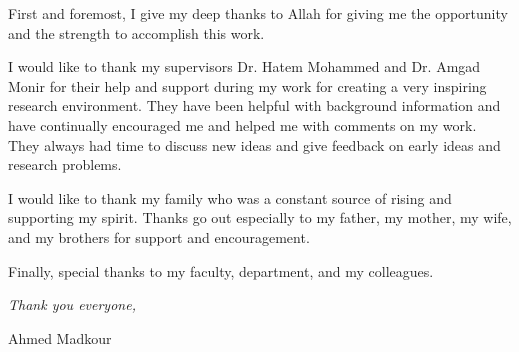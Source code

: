 


\begin{acknowledgements}
    First and foremost, I give my deep thanks to Allah for giving me the opportunity and the strength to accomplish this work.



    I would like to thank my supervisors Dr. Hatem Mohammed and Dr. Amgad Monir for their help and support during my work for creating a very inspiring research environment. They have been helpful with background information and have continually encouraged me and helped me with comments on my work. They always had time to discuss new ideas and give feedback on early ideas and research problems.
    
    I would like to thank my family who was a constant source of rising and supporting my spirit. Thanks go out especially to my father, my mother, my wife, and my brothers for support and encouragement.
    
    Finally, special thanks to my faculty, department, and my colleagues.
    
\begin{flushright}
\textit{Thank you everyone,}

Ahmed Madkour

\monthname \ \the\year







\end{flushright}



\end{acknowledgements}




